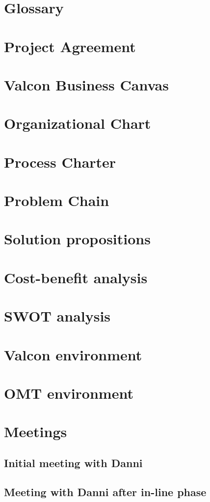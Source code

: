 \chapter{Glossary}

\chapter{Project Agreement}

\chapter{Valcon Business Canvas}


\label{app:it_strategy}

\chapter{Organizational Chart}

\chapter{Process Charter}

\chapter{Problem Chain}

\chapter{Solution propositions}

\chapter{Cost-benefit analysis}

\chapter{SWOT analysis}

\chapter{Valcon environment}

\chapter{OMT environment}

\chapter{Meetings}
\section{Initial meeting with Danni}

\section{Meeting with Danni after in-line phase}

